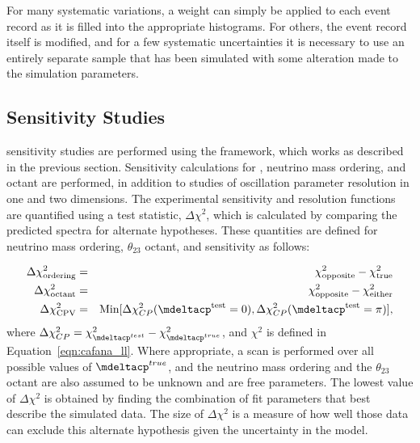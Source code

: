 For many systematic variations, a weight can simply be applied to each event record as it is filled into the appropriate histograms. For others, the event record itself is modified, and for a few systematic uncertainties it is necessary to use an entirely separate sample that has been simulated with some alteration made to the simulation parameters. %







\subsection{ Sensitivity Studies}
\label{sect:methods-dunefits}

 sensitivity studies are performed using the  framework, which works as described in the previous section. Sensitivity calculations for , neutrino mass ordering, and octant are performed, in addition to studies of oscillation parameter resolution in one and two dimensions.
The experimental sensitivity and resolution functions are quantified using a test statistic, $\Delta\chi^2$, which is calculated by comparing the predicted spectra for alternate hypotheses. These quantities are defined for neutrino mass ordering, $\theta_{23}$ octant, and  sensitivity as follows:

\begin{eqnarray}
\Delta\chi^2_{\textrm{ordering}} & = & \chi^2_{\textrm{opposite}} - \chi^2_{\textrm{true}} \label{eq:dx2_MH}\\
\Delta\chi^2_{\textrm{octant}} & = & \chi^2_{\textrm{opposite}} - \chi^2_{\textrm{either}} \\
\Delta\chi^2_{\textrm{CPV}} & = & \textrm{Min}[\Delta\chi^2_{CP}(\mdeltacp^{\textrm{test}}=0),\Delta\chi^2_{CP}(\mdeltacp^{\textrm{test}}=\pi)],
\end{eqnarray}
where $\Delta\chi^2_{CP} = \chi^{2}_{\mdeltacp^{test}} - \chi^2_{\mdeltacp^{true}}$, and $\chi^2$ is defined in Equation~\ref{eqn:cafana_ll}. Where appropriate, a scan is performed over all possible values of $\mdeltacp^{true}$, and the neutrino mass ordering and the $\theta_{23}$ octant are also assumed to be unknown and are free parameters. The lowest value of $\Delta\chi^2$ is obtained by finding the combination of fit parameters that best describe the simulated data. The size of $\Delta\chi^2$ is a measure of how well those data can exclude this alternate hypothesis given the uncertainty in the model. 



